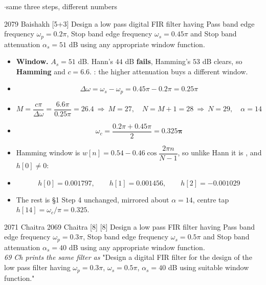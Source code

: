 {\color{sub}\footnotesize {} \gap$\cdot$\gap same three steps, different numbers}

\begin{asked}{2079 Baishakh \textperiodcentered{} [5+3]}
Design a low pass digital FIR filter having Pass band edge frequency $\omega_p=0.2\pi$,
Stop band edge frequency $\omega_s=0.45\pi$ and Stop band attenuation $\alpha_s=51$ dB
using any appropriate window function.
\end{asked}

\begin{itemize}
  \item \textbf{Window.} $A_s=51$ dB. Hann's $44$ dB \textbf{fails}, Hamming's $53$ dB
        clears, so \textbf{Hamming} and $c=6.6$. : the higher attenuation buys a different window.
  \item[] \[ \Delta\omega=\omega_s-\omega_p=0.45\pi-0.2\pi=0.25\pi \]
  \item[] \[ M=\frac{c\pi}{\Delta\omega}=\frac{6.6\pi}{0.25\pi}=26.4
             \ \Rightarrow\ M=27,\quad N=M+1=28\ \Rightarrow\ \boxed{N=29},\quad
             \alpha=14 \]
  \item[] \[ \omega_c=\frac{0.2\pi+0.45\pi}{2}=\mathbf{0.325\pi} \]
  \item Hamming window is $w[n]=0.54-0.46\cos\dfrac{2\pi n}{N-1}$, so unlike Hann it is
        , and $h[0]\ne0$:
  \item[] \[ h[0]=0.001797,\qquad h[1]=0.001456,\qquad h[2]=-0.001029 \]
  \item The rest is \S1 Step 4 unchanged, mirrored about $\alpha=14$, centre tap
        $h[14]=\omega_c/\pi=0.325$.
\end{itemize}

\begin{asked}{2071 Chaitra \textperiodcentered{} 2069 Chaitra \textperiodcentered{} [8] [8]}
Design a low pass FIR filter having Pass band edge frequency $\omega_p=0.3\pi$, Stop band
edge frequency $\omega_s=0.5\pi$ and Stop band attenuation $\alpha_s=40$ dB using any
appropriate window function.\\
\textit{69 Ch prints the same filter as} "Design a digital FIR filter for the design of
the low pass filter having $\omega_p=0.3\pi$, $\omega_s=0.5\pi$, $\alpha_s=40$ dB using
suitable window function."
\end{asked}

